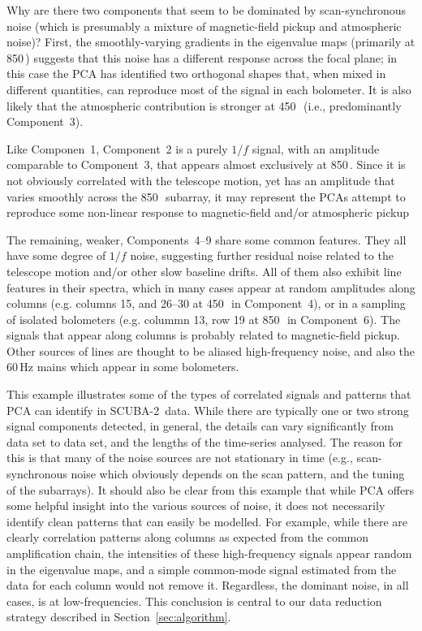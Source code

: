 \documentclass[useAMS,usenatbib,nofootinbib]{mn2e}
\newcommand{\scuba}{SCUBA-2}
\begin{document}
Why are there two components that seem to be dominated by
scan-synchronous noise (which is presumably a mixture of
magnetic-field pickup and atmospheric noise)? First, the
smoothly-varying gradients in the eigenvalue maps (primarily at
850\,\micron) suggests that this noise has a different response across
the focal plane; in this case the PCA has identified two orthogonal
shapes that, when mixed in different quantities, can reproduce most of
the signal in each bolometer. It is also likely that the atmospheric
contribution is stronger at 450\,\micron\ (i.e., predominantly
Component~3).

Like Componen~1, Component~2 is a purely $1/f$ signal, with an
amplitude comparable to Component~3, that appears almost exclusively
at 850\,\micron. Since it is not obviously correlated with the
telescope motion, yet has an amplitude that varies smoothly across the
850\,\micron\ subarray, it may represent the PCAs attempt to reproduce
some non-linear response to magnetic-field and/or atmospheric pickup

The remaining, weaker, Components~4--9 share some common
features. They all have some degree of $1/f$ noise, suggesting further
residual noise related to the telescope motion and/or other slow
baseline drifts. All of them also exhibit line features in their
spectra, which in many cases appear at random amplitudes along columns
(e.g. columns 15, and 26--30 at 450\,\micron\ in Component~4), or in a
sampling of isolated bolometers (e.g. colummn 13, row 19 at
850\,\micron\ in Component~6). The signals that appear along columns
is probably related to magnetic-field pickup. Other sources of lines
are thought to be aliased high-frequency noise, and also the 60\,Hz
mains which appear in some bolometers.

This example illustrates some of the types of correlated signals and
patterns that PCA can identify in \scuba\ data. While there are
typically one or two strong signal components detected, in general,
the details can vary significantly from data set to data set, and the
lengths of the time-series analysed. The reason for this is that many
of the noise sources are not stationary in time (e.g.,
scan-synchronous noise which obviously depends on the scan pattern,
and the tuning of the subarrays). It should also be clear from this
example that while PCA offers some helpful insight into the various
sources of noise, it does not necessarily identify clean patterns that
can easily be modelled. For example, while there are clearly
correlation patterns along columns as expected from the common
amplification chain, the intensities of these high-frequency signals
appear random in the eigenvalue maps, and a simple common-mode signal
estimated from the data for each column would not remove
it. Regardless, the dominant noise, in all cases, is at
low-frequencies. This conclusion is central to our data reduction
strategy described in Section~\ref{sec:algorithm}.
\end{document}
